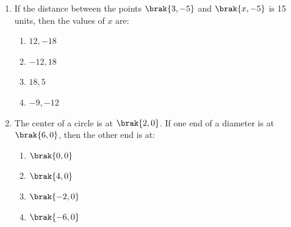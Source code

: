 \begin{enumerate}
 \item If the distance between the points $\brak{3, -5}$ and $\brak{x, -5}$ is 15 units, then the values of $x$ are:
    \begin{enumerate}
    \item $12, -18$
    \item $-12, 18$
    \item $18, 5$
    \item $-9, -12$
    \end{enumerate}

    \item The center of a circle is at $\brak{2, 0}$. If one end of a diameter is at $\brak{6, 0}$, then the other end is at:
	\begin{enumerate}    
		\item $\brak{0, 0}$
		\item $\brak{4, 0}$
		\item $\brak{-2, 0}$
		\item $\brak{-6, 0}$
	\end{enumerate}


\end{enumerate}
